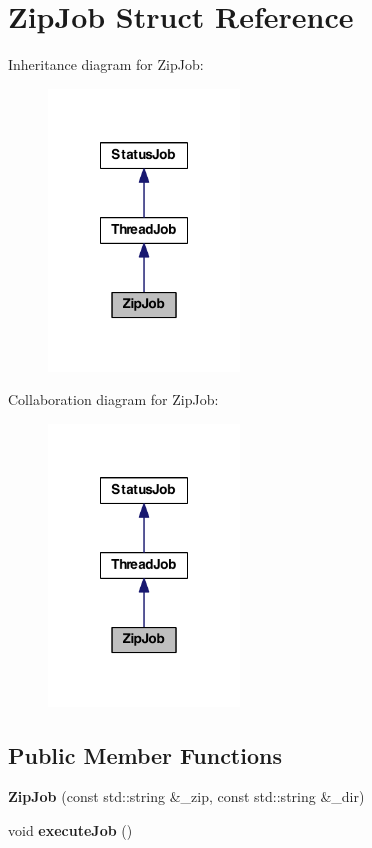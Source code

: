 \hypertarget{struct_zip_job}{\section{Zip\-Job Struct Reference}
\label{struct_zip_job}
}


Inheritance diagram for Zip\-Job\-:
\nopagebreak
\begin{figure}[H]
\begin{center}
\leavevmode
\includegraphics[width=144pt]{struct_zip_job__inherit__graph}
\end{center}
\end{figure}


Collaboration diagram for Zip\-Job\-:
\nopagebreak
\begin{figure}[H]
\begin{center}
\leavevmode
\includegraphics[width=144pt]{struct_zip_job__coll__graph}
\end{center}
\end{figure}
\subsection*{Public Member Functions}
\begin{DoxyCompactItemize}
\item 
\hypertarget{struct_zip_job_a557139fc2a919d504dadf66881bde7ef}{{\bfseries Zip\-Job} (const std\-::string \&\-\_\-zip, const std\-::string \&\-\_\-dir)}\label{struct_zip_job_a557139fc2a919d504dadf66881bde7ef}

\item 
\hypertarget{struct_zip_job_a76610a05040414fc8ddf4a49380d4146}{void {\bfseries execute\-Job} ()}\label{struct_zip_job_a76610a05040414fc8ddf4a49380d4146}

\end{DoxyCompactItemize}
